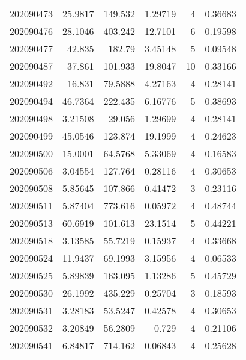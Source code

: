 \begin{tabular}{rrrrrr}
 202090473 &         25.9817  &      149.532  &            1.29719 &           4 & 0.36683 \\
 202090476 &         28.1046  &      403.242  &           12.7101  &           6 & 0.19598 \\
 202090477 &         42.835   &      182.79   &            3.45148 &           5 & 0.09548 \\
 202090487 &         37.861   &      101.933  &           19.8047  &          10 & 0.33166 \\
 202090492 &         16.831   &       79.5888 &            4.27163 &           4 & 0.28141 \\
 202090494 &         46.7364  &      222.435  &            6.16776 &           5 & 0.38693 \\
 202090498 &          3.21508 &       29.056  &            1.29699 &           4 & 0.28141 \\
 202090499 &         45.0546  &      123.874  &           19.1999  &           4 & 0.24623 \\
 202090500 &         15.0001  &       64.5768 &            5.33069 &           4 & 0.16583 \\
 202090506 &          3.04554 &      127.764  &            0.28116 &           4 & 0.30653 \\
 202090508 &          5.85645 &      107.866  &            0.41472 &           3 & 0.23116 \\
 202090511 &          5.87404 &      773.616  &            0.05972 &           4 & 0.48744 \\
 202090513 &         60.6919  &      101.613  &           23.1514  &           5 & 0.44221 \\
 202090518 &          3.13585 &       55.7219 &            0.15937 &           4 & 0.33668 \\
 202090524 &         11.9437  &       69.1993 &            3.15956 &           4 & 0.06533 \\
 202090525 &          5.89839 &      163.095  &            1.13286 &           5 & 0.45729 \\
 202090530 &         26.1992  &      435.229  &            0.25704 &           3 & 0.18593 \\
 202090531 &          3.28183 &       53.5247 &            0.42578 &           4 & 0.30653 \\
 202090532 &          3.20849 &       56.2809 &            0.729   &           4 & 0.21106 \\
 202090541 &          6.84817 &      714.162  &            0.06843 &           4 & 0.25628 \\

\end{tabular}
